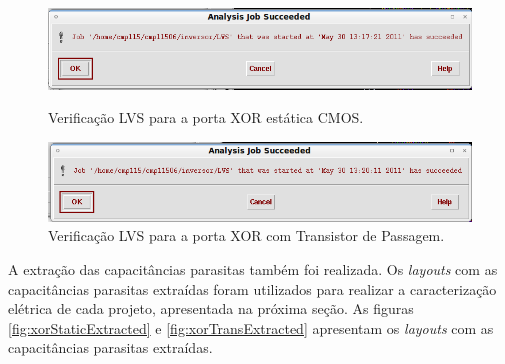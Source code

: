 \documentclass[a4paper,10pt] {article}
\begin{document}
\begin{figure}[h]
  \begin{minipage} [b] {0.48 \linewidth}
	\centering
	\includegraphics[scale=0.2]{xorStaticCMOSlvs.png}
	\caption{Verificação LVS para a porta XOR estática CMOS.}
	\label{fig:xorStaticLVS}
  \end{minipage}
  \begin{minipage} [b] {0.48 \linewidth}
	\centering
	\includegraphics[scale=0.2]{xorTransGateLvs.png}
	\caption{Verificação LVS para a porta XOR com Transistor de Passagem.}
	\label{fig:xorTransLVS}
  \end{minipage}
\end{figure}

A extração das capacitâncias parasitas também foi realizada.
Os \textit{layouts} com as capacitâncias parasitas extraídas foram utilizados para realizar a caracterização elétrica de cada projeto,
apresentada na próxima seção. As figuras \ref{fig:xorStaticExtracted} e \ref{fig:xorTransExtracted} apresentam os \textit{layouts} com as capacitâncias parasitas extraídas.
\end{document}
